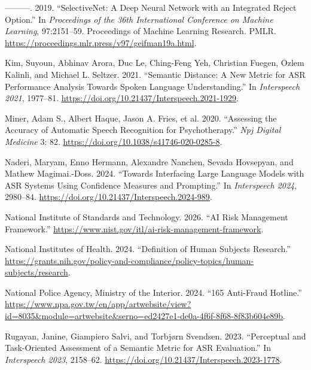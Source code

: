 \documentclass[
]{article}
\newlength{\cslhangindent}
\newlength{\cslentryspacingunit} %
\newenvironment{CSLReferences}[2] %
 {%
  \setlength{\parindent}{0pt}
  \ifodd #1
  \let\oldpar\par
  \def\par{\hangindent=\cslhangindent\oldpar}
  \fi
  \setlength{\parskip}{#2\cslentryspacingunit}
 }%
 {}
\begin{document}
\begin{CSLReferences}{1}{0}
\leavevmode{}%
---------. 2019. {``SelectiveNet: A Deep Neural Network with an
Integrated Reject Option.''} In \emph{Proceedings of the 36th
International Conference on Machine Learning}, 97:2151--59. Proceedings
of Machine Learning Research. PMLR.
\url{https://proceedings.mlr.press/v97/geifman19a.html}.

\leavevmode{}%
Kim, Suyoun, Abhinav Arora, Duc Le, Ching-Feng Yeh, Christian Fuegen,
Ozlem Kalinli, and Michael L. Seltzer. 2021. {``Semantic Distance: A New
Metric for ASR Performance Analysis Towards Spoken Language
Understanding.''} In \emph{Interspeech 2021}, 1977--81.
\url{https://doi.org/10.21437/Interspeech.2021-1929}.

\leavevmode{}%
Miner, Adam S., Albert Haque, Jason A. Fries, et al. 2020. {``Assessing
the Accuracy of Automatic Speech Recognition for Psychotherapy.''}
\emph{Npj Digital Medicine} 3: 82.
\url{https://doi.org/10.1038/s41746-020-0285-8}.

\leavevmode{}%
Naderi, Maryam, Enno Hermann, Alexandre Nanchen, Sevada Hovsepyan, and
Mathew Magimai.-Doss. 2024. {``Towards Interfacing Large Language Models
with ASR Systems Using Confidence Measures and Prompting.''} In
\emph{Interspeech 2024}, 2980--84.
\url{https://doi.org/10.21437/Interspeech.2024-989}.

\leavevmode{}%
National Institute of Standards and Technology. 2026. {``AI Risk
Management Framework.''}
\url{https://www.nist.gov/itl/ai-risk-management-framework}.

\leavevmode{}%
National Institutes of Health. 2024. {``Definition of Human Subjects
Research.''}
\url{https://grants.nih.gov/policy-and-compliance/policy-topics/human-subjects/research}.

\leavevmode{}%
National Police Agency, Ministry of the Interior. 2024. {``165
Anti-Fraud Hotline.''}
\url{https://www.npa.gov.tw/en/app/artwebsite/view?id=8035\&module=artwebsite\&serno=ed2427e1-de0a-4f6f-8f68-8f83b604e89b}.

\leavevmode{}%
Rugayan, Janine, Giampiero Salvi, and Torbjørn Svendsen. 2023.
{``Perceptual and Task-Oriented Assessment of a Semantic Metric for ASR
Evaluation.''} In \emph{Interspeech 2023}, 2158--62.
\url{https://doi.org/10.21437/Interspeech.2023-1778}.

\end{CSLReferences}
\end{document}
